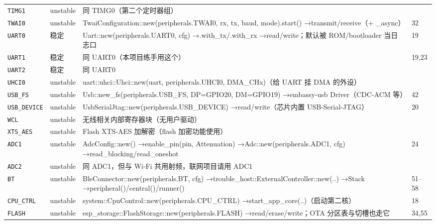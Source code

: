 \documentclass[UTF8,a4paper,11pt,fontset=fandol]{ctexart}
\newcommand{\fld}[1]{\texttt{#1}}
\begin{document}
\begin{center}
\begin{longtable}{@{}p{2.15cm}p{1.0cm}>{\raggedright\arraybackslash}p{9.4cm}p{1.65cm}@{}}
\fld{TIMG1} & unstable & 同 TIMG0（第二个定时器组） &  \\
\fld{TWAI0} & unstable & TwaiConfiguration::\allowbreak new(peripherals.TWAI0, rx, tx, baud, mode).start() →\allowbreak  transmit/\allowbreak receive（+ \_async） & 32 \\
\fld{UART0} & 稳定 & Uart::\allowbreak new(peripherals.UART0, cfg) →\allowbreak  .with\_tx/\allowbreak .with\_rx →\allowbreak  read/\allowbreak write；默认被 ROM/\allowbreak bootloader 当日志口 & 19 \\
\fld{UART1} & 稳定 & 同 UART0（本项目练手用这个） & 19,23 \\
\fld{UART2} & 稳定 & 同 UART0 &  \\
\fld{UHCI0} & unstable & uart::\allowbreak uhci::\allowbreak Uhci::\allowbreak new(uart, peripherals.UHCI0, DMA\_CHx)（给 UART 挂 DMA 的外设） &  \\
\fld{USB\_FS} & unstable & Usb::\allowbreak new\_fs(peripherals.USB\_FS, DP=GPIO20, DM=GPIO19) →\allowbreak  embassy-usb Driver（CDC-ACM 等） & 42 \\
\fld{USB\_DEVICE} & unstable & UsbSerialJtag::\allowbreak new(peripherals.USB\_DEVICE) →\allowbreak  read/\allowbreak write（芯片内置 USB-Serial-JTAG） & 20 \\
\fld{WCL} & unstable & 无线相关内部寄存器块（无用户驱动） &  \\
\fld{XTS\_AES} & unstable & Flash XTS-AES 加解密（flash 加密功能使用） &  \\
\fld{ADC1} & unstable & AdcConfig::\allowbreak new() →\allowbreak  enable\_pin(pin, Attenuation) →\allowbreak  Adc::\allowbreak new(peripherals.ADC1, cfg) →\allowbreak  read\_blocking/\allowbreak read\_oneshot & 24 \\
\fld{ADC2} & unstable & 同 ADC1，但与 Wi-Fi 共用射频，联网项目请用 ADC1 &  \\
\fld{BT} & unstable & BleConnector::\allowbreak new(peripherals.BT, cfg) →\allowbreak  trouble\_host::\allowbreak ExternalController::\allowbreak new(..) →\allowbreak  Stack →\allowbreak  peripheral()/\allowbreak central()/\allowbreak runner() & 51--58 \\
\fld{CPU\_CTRL} & unstable & system::\allowbreak CpuControl::\allowbreak new(peripherals.CPU\_CTRL) →\allowbreak  start\_app\_core(..)（启动第二核） & 18 \\
\fld{FLASH} & unstable & esp\_storage::\allowbreak FlashStorage::\allowbreak new(peripherals.FLASH) →\allowbreak  read/\allowbreak erase/\allowbreak write；OTA 分区表与切槽也走它 & 34,55 \\

\end{longtable}
\end{center}
\end{document}
